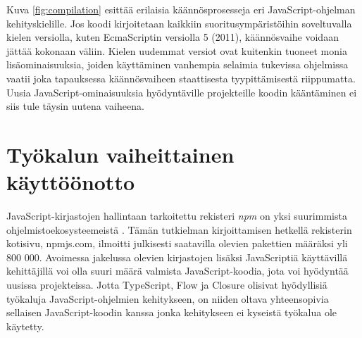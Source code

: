 Kuva \ref{fig:compilation} esittää erilaisia käännösprosesseja eri
JavaScript-ohjelman kehityskielille. Jos koodi kirjoitetaan kaikkiin
suoritusympäristöihin soveltuvalla kielen versiolla, kuten EcmaScriptin
versiolla 5 (2011), käännösvaihe voidaan jättää kokonaan väliin. Kielen
uudemmat versiot ovat kuitenkin tuoneet monia lisäominaisuuksia, joiden
käyttäminen vanhempia selaimia tukevissa ohjelmissa vaatii joka tapauksessa
käännösvaiheen staattisesta tyypittämisestä riippumatta. Uusia
JavaScript-o\-mi\-nai\-suuk\-si\-a hyödyntäville projekteille koodin kääntäminen ei
siis tule täysin uutena vaiheena.

\section{Työkalun vaiheittainen käyttöönotto}

JavaScript-kirjastojen hallintaan tarkoitettu rekisteri \textit{npm} on yksi
suurimmista ohjelmistoekosysteemeistä \cite{DynamicsOfJSPackages}.
Tämän tutkielman kirjoittamisen hetkellä rekisterin kotisivu,\newline
npmjs.com, ilmoitti julkisesti saatavilla olevien pakettien määräksi yli 800 000.
Avoimessa jakelussa olevien kirjastojen lisäksi JavaScriptiä käyttävillä
kehittäjillä voi olla suuri määrä valmista JavaScript-koodia, jota voi
hyödyntää uusissa projekteissa. Jotta TypeScript, Flow ja Closure olisivat
hyödyllisiä työkaluja JavaScript-ohjelmien kehitykseen, on niiden oltava
yhteensopivia sellaisen JavaScript-koodin kanssa jonka kehitykseen ei
kyseistä työkalua ole käytetty.

